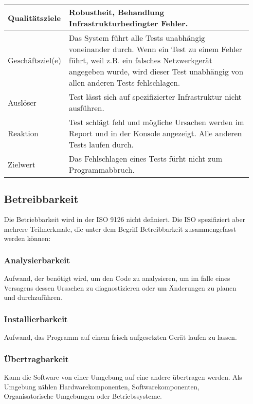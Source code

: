 \documentclass[
	ngerman,
	toc=listof, %
	toc=bibliography, %
	footnotes=multiple, %
	parskip=half, %
	numbers=noendperiod %
]{scrartcl}
\begin{document}
		\begin{tabularx}{\textwidth}{lX}
			\toprule
			Qualitätsziele & Robustheit, Behandlung Infrastrukturbedingter Fehler.  \\
			\midrule
			Geschäftsziel(e) & Das System führt alle Tests unabhängig voneinander durch. Wenn ein Test zu einem Fehler führt, weil z.B. ein falsches Netzwerkgerät angegeben wurde, wird dieser Test unabhängig von allen anderen Tests fehlschlagen.  \\
			\midrule
			Auslöser & Test lässt sich auf spezifizierter Infrastruktur nicht ausführen.  \\
			\midrule
			Reaktion & Test schlägt fehl und mögliche Ursachen werden im Report und in der Konsole angezeigt. Alle anderen Tests laufen durch.  \\
			\midrule
			Zielwert & Das Fehlschlagen eines Tests fürht nicht zum Programmabbruch.  \\
			\bottomrule
		\end{tabularx}

	\subsection{Betreibbarkeit}
	Die Betriebbarkeit wird in der ISO 9126 nicht definiert. Die ISO spezifiziert aber mehrere Teilmerkmale, die unter dem Begriff Betreibbarkeit zusammengefasst werden können:

		\subsubsection{Analysierbarkeit}
		Aufwand, der benötigt wird, um den Code zu analysieren, um im falle eines Versagens dessen Ursachen zu diagnostizieren oder um Änderungen zu planen und durchzuführen.

		\subsubsection{Installierbarkeit}
		Aufwand, das Programm auf einem frisch aufgesetzten Gerät laufen zu lassen.

		\subsubsection{Übertragbarkeit}
		Kann die Software von einer Umgebung auf eine andere übertragen werden. 
		Als Umgebung zählen Hardwarekomponenten, Softwarekomponenten, Organisatorische Umgebungen oder Betriebssysteme. 
\end{document}

